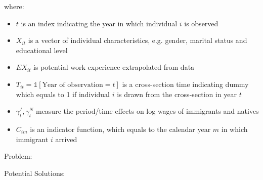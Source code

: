             where:

            \begin{itemize}
                \item $t$ is an index indicating the year in which individual $i$ is observed
                \item $X_{it}$ is a vector of individual characteristics, e.g. gender, marital status and educational level
                \item $EX_{it}$ is potential work experience extrapolated from data
                \item $T_{it}=\mathds{1}[\text{Year of observation}=t]$ is a cross-section time indicating dummy which equals to 1 if individual $i$ is drawn from the cross-section in year $t$
                \item $\gamma_{t}^I,\gamma_{t}^N$ measure the period/time effects on log wages of immigrants and natives
                \item $C_{im}$ is an indicator function, which equals to the calendar year $m$ in which immigrant $i$ arrived
            \end{itemize}

            Problem: 

            Potential Solutions:

